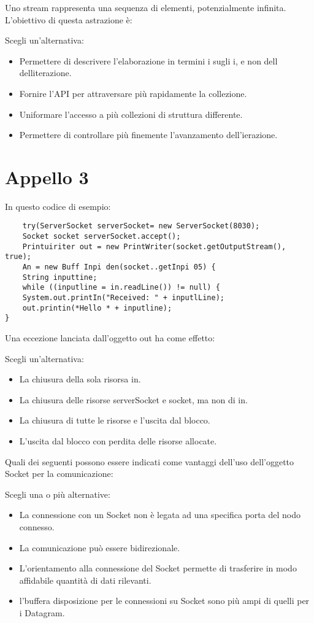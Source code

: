 \documentclass{article}
\begin{document}
Uno stream rappresenta una sequenza di elementi, potenzialmente infinita. L'obiettivo di questa astrazione è:

Scegli un'alternativa: 
\begin{itemize}
	\item \checkmark Permettere di descrivere l'elaborazione in termini i sugli i, e non dell delliterazione.
	\item Fornire l'API per attraversare più rapidamente la collezione.
	\item Uniformare l'accesso a più collezioni di struttura differente.
	\item Permettere di controllare più finemente l'avanzamento dell'ierazione.
\end{itemize}


\section{Appello 3} 

In questo codice di esempio:

\begin{lstlisting}
	try(ServerSocket serverSocket= new ServerSocket(8030);
	Socket socket serverSocket.accept();
	Printuiriter out = new PrintWriter(socket.getOutputStream(), true);
	An = new Buff Inpi den(socket..getInpi 05) {
	String inputtine;
	while ((inputline = in.readLine()) != null) {
	System.out.printIn("Received: " + inputlLine);
	out.printin(*Hello * + inputline);
}
\end{lstlisting}

Una eccezione lanciata dall'oggetto out ha come effetto:

Scegli un'alternativa: 
\begin{itemize}
	\item La chiusura della sola risorsa in.
	\item La chiusura delle risorse serverSocket e socket, ma non di in.
	\item \checkmark La chiusura di tutte le risorse e l'uscita dal blocco.
	\item L'uscita dal blocco con perdita delle risorse allocate.
\end{itemize}

Quali dei seguenti possono essere indicati come vantaggi dell'uso dell'oggetto Socket per la comunicazione:

Scegli una o più alternative:

\begin{itemize}
	\item La connessione con un Socket non è legata ad una specifica porta del nodo connesso.
	\item \checkmark La comunicazione può essere bidirezionale.
	\item \checkmark L'orientamento alla connessione del Socket permette di trasferire in modo affidabile quantità di dati rilevanti.
	\item l'buffera disposizione per le connessioni su Socket sono più ampi di quelli per i Datagram.
\end{itemize}
\end{document}
